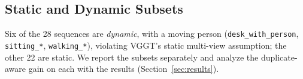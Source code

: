 \subsection{Static and Dynamic Subsets}
\label{sec:exp_expansion}

Six of the 28 sequences are \emph{dynamic}, with a moving person (\texttt{desk\_with\_person}, \texttt{sitting\_*}, \texttt{walking\_*}), violating VGGT's static multi-view assumption; the other 22 are static. We report the subsets separately and analyze the duplicate-aware gain on each with the results (Section~\ref{sec:results}).